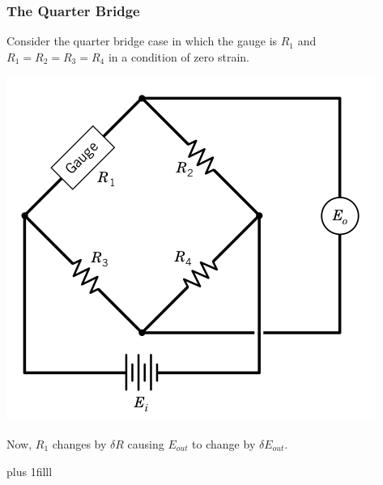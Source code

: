 \documentclass[fleqn]{beamer} %
\newcommand{\sectionIIsubsectionItitle}{The Quarter Bridge}
\newcommand{\btVFill}{\vskip0pt plus 1filll}
\begin{document}
		    \begin{frame}[label=sectionIIsubsectionI]
				\frametitle{\sectionIIsubsectionItitle} \scriptsize

\begin{multicols}{2}
Consider the quarter bridge case in which the gauge is $R_1$ and $R_1=R_2=R_3=R_4$ in a condition of zero strain. \vspcc

\includegraphics[scale=.18]{images/bridge_circuit_fig2.png}
\end{multicols}

\vspcc
Now, $R_1$ changes by $\delta R$ causing $E_{out}$ to change by $\delta E_{out}$. \vspcc
{}\vspc

				
				\btVFill

			
					
			\end{frame}	
\end{document}
